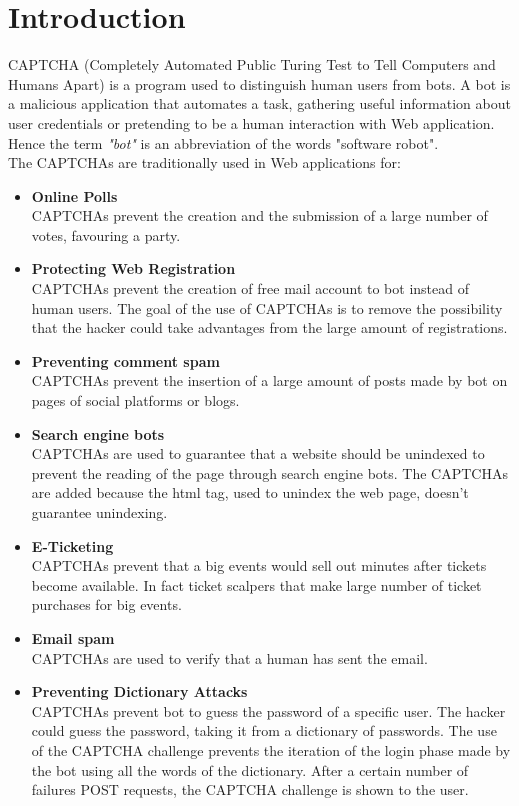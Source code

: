 \chapter{Introduction}
CAPTCHA (Completely Automated Public Turing Test to Tell Computers and Humans Apart) is a program used to distinguish human users from bots. A bot is a malicious application that automates a task, gathering useful information about user credentials or pretending to be a human interaction with Web application. Hence the term \textit{"bot"} is an abbreviation of the words "software robot".\\
The CAPTCHAs are traditionally used in Web applications for\cite{text_audio}:
\begin{itemize}
\item{\textbf{Online Polls}\\
CAPTCHAs prevent the creation and the submission of a large number of votes, favouring a party.
}
\item{\textbf{Protecting Web Registration}\\
CAPTCHAs prevent the creation of free mail account to bot instead of human users. The goal of the use of CAPTCHAs is to remove the possibility that the hacker could take advantages from the large amount of registrations.
}
\item{\textbf{Preventing comment spam}\\
CAPTCHAs prevent the insertion of a large amount of posts made by bot on pages of social platforms or blogs.
}
\item{\textbf{Search engine bots}\\
CAPTCHAs are used to guarantee that a website should be unindexed to prevent the reading of the page through search engine bots. The CAPTCHAs are added because the html tag, used to unindex the web page, doesn't guarantee unindexing.
}
\item{\textbf{E-Ticketing}\\
CAPTCHAs prevent that a big events would sell out minutes after tickets become available. In fact ticket scalpers that make large number of ticket purchases for big events.
}
\item{\textbf{Email spam}\\
CAPTCHAs are used to verify that a human has sent the email.
}
\item{\textbf{Preventing Dictionary Attacks}\\
CAPTCHAs prevent bot to guess the password of a specific user. The hacker could guess the password, taking it from a dictionary of passwords. The use of the CAPTCHA challenge prevents the iteration of the login phase made by the bot using all the words of the dictionary. After a certain number of failures POST requests, the CAPTCHA challenge is shown to the user.}

\end{itemize}
